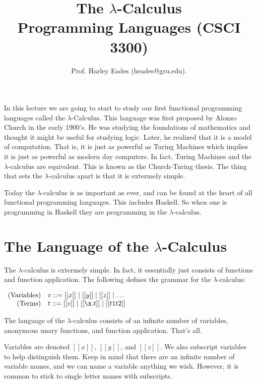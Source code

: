 \documentclass{article}
\title{The $\lambda$-Calculus\\Programming Languages (CSCI 3300)\vspace{-22px}}
\author{Prof. Harley Eades (heades@gru.edu).}
\date{\vspace{-22px}}
\begin{document}
\maketitle  

In this lecture we are going to start to study our first functional
programming languages called the $\lambda$-Calculus.  This language
was first proposed by Alonzo Church in the early 1900's.  He was
studying the foundations of mathematics and thought it might be useful
for studying logic.  Later, he realized that it is a model of
computation.  That is, it is just as powerful as Turing Machines which
implies it is just as powerful as modern day computers.  In fact,
Turing Machines and the $\lambda$-calculus are equivalent.  This is
known as the Church-Turing thesis.  The thing that sets the
$\lambda$-calculus apart is that it is extermely simple.

Today the $\lambda$-calculus is as important as ever, and can be found
at the heart of all functional programming languages.  This includes
Haskell.  So when one is programming in Haskell they are programming
in the $\lambda$-calculus.

\section{The Language of the $\lambda$-Calculus}
\label{sec:the_lambda-calculus}
The $\lambda$-calculus is extermely simple.  In fact, it essentially
just consists of functions and function application.  The following
defines the grammar for the $\lambda$-calculus:
\begin{center}
  \begin{math}
    \begin{array}{rll}
      \text{(Variables)} & v ::= [[x]] \mid [[y]] \mid [[z]] \mid \ldots\\
      \text{(Terms)}     & t ::= [[v]] \mid [[\x.t]] \mid [[t1 t2]]\\
    \end{array}
  \end{math}
\end{center}
The language of the $\lambda$-calculus consists of an infinite number
of variables, anonymous unary functions, and function application.
That's all.

Variables are denoted $[[x]]$, $[[y]]$, and $[[z]]$.  We also
subscript variables to help distinguish them.  Keep in mind that there
are an infinite number of variable names, and we can name a variable
anything we wish.  However, it is common to stick to single letter
names with subscripts.  
\end{document}
